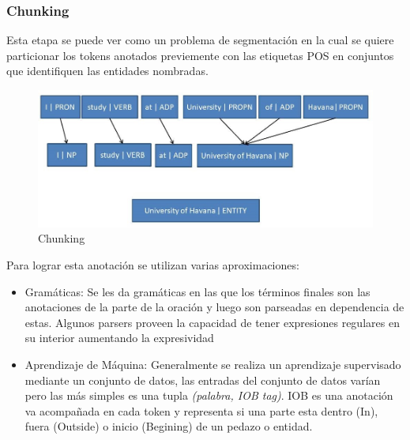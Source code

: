 \documentclass[runningheads]{llncs}
\begin{document}
\subsubsection{Chunking}

%


Esta etapa se puede ver como un problema de segmentación en la cual se quiere particionar los tokens anotados previemente con las etiquetas POS en conjuntos que identifiquen las entidades nombradas.

\begin{figure}
\includegraphics[width=\textwidth]{namedentity.jpg}
\caption{Chunking} \label{chunkingfig}
\end{figure}

Para lograr esta anotación se utilizan varias aproximaciones:

\begin{itemize}

\item Gramáticas: Se les da gramáticas en las que los términos finales son las anotaciones de la parte de la
oración y luego son parseadas en dependencia de estas. Algunos parsers proveen la capacidad de 
tener expresiones regulares en su interior aumentando la expresividad \cite{nltkgrammar}

\item Aprendizaje de Máquina: Generalmente se realiza un aprendizaje supervisado mediante un conjunto de datos, las entradas del conjunto de datos varían pero las más simples es una tupla \emph{(palabra, IOB tag)}.  IOB es una anotación va acompañada en cada token y representa si una parte esta dentro (In), fuera (Outside) o inicio (Begining) de un pedazo o entidad.

\end{itemize}
\end{document}
